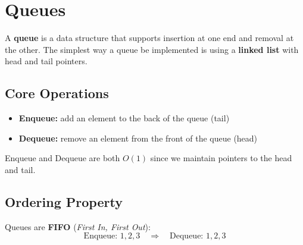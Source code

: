\section{Queues}

A \textbf{queue} is a data structure that supports insertion at one end and removal at the other.  
The simplest way a queue be implemented is using a \textbf{linked list} with head and tail pointers.

\subsection{Core Operations}
\begin{itemize}
  \item \textbf{Enqueue:} add an element to the back of the queue (tail)
  \item \textbf{Dequeue:} remove an element from the front of the queue (head)
\end{itemize}
Enqueue and Dequeue are both \textbf{$O(1)$} since we maintain pointers to the head and tail.

\subsection{Ordering Property}
Queues are \textbf{FIFO} (\textit{First In, First Out}):
\[
\text{Enqueue: } 1,2,3 \quad \Rightarrow \quad \text{Dequeue: } 1,2,3
\]